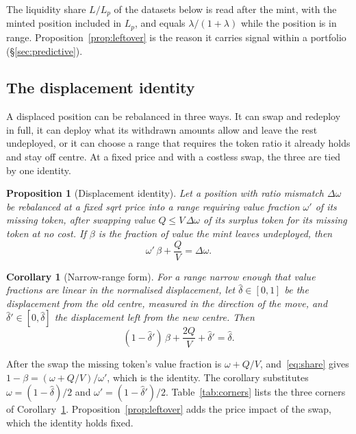 \documentclass[11pt,a4paper]{article}
\theoremstyle{siphon}
\newtheorem{corollary}{Corollary}[theorem]
\newtheorem{proposition}[theorem]{Proposition}
\begin{document}
The liquidity share $L/L_p$ of the datasets below is read after the mint, with the minted position included in $L_p$, and equals $\lambda/(1+\lambda)$ while the position is in range. Proposition~\ref{prop:leftover} is the reason it carries signal within a portfolio (\S\ref{sec:predictive}).

\subsection{The displacement identity}\label{sec:identity}

A displaced position can be rebalanced in three ways. It can swap and redeploy in full, it can deploy what its withdrawn amounts allow and leave the rest undeployed, or it can choose a range that requires the token ratio it already holds and stay off centre. At a fixed price and with a costless swap, the three are tied by one identity.

\begin{proposition}[Displacement identity]\label{prop:identity}
Let a position with ratio mismatch $\Delta\omega$ be rebalanced at a fixed sqrt price into a range requiring value fraction $\omega'$ of its missing token, after swapping value $Q \leq V\,\Delta\omega$ of its surplus token for its missing token at no cost. If $\beta$ is the fraction of value the mint leaves undeployed, then
\[
\omega'\,\beta + \frac{Q}{V} = \Delta\omega .
\]
\end{proposition}

\begin{corollary}[Narrow-range form]\label{cor:narrow}
For a range narrow enough that value fractions are linear in the normalised displacement, let $\hat\delta \in [0,1]$ be the displacement from the old centre, measured in the direction of the move, and $\hat\delta' \in [0, \hat\delta]$ the displacement left from the new centre. Then
\[
(1 - \hat\delta')\,\beta + \frac{2Q}{V} + \hat\delta' = \hat\delta .
\]
\end{corollary}

\noindent After the swap the missing token's value fraction is $\omega + Q/V$, and~\eqref{eq:share} gives $1 - \beta = (\omega + Q/V)/\omega'$, which is the identity. The corollary substitutes $\omega = (1 - \hat\delta)/2$ and $\omega' = (1 - \hat\delta')/2$. Table~\ref{tab:corners} lists the three corners of Corollary~\ref{cor:narrow}. Proposition~\ref{prop:leftover} adds the price impact of the swap, which the identity holds fixed.
\end{document}
